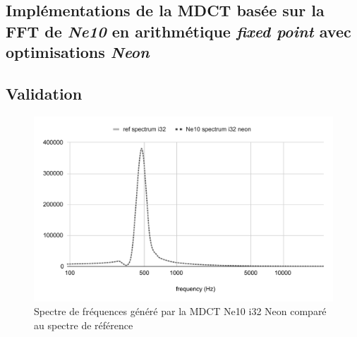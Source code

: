 \documentclass{article}
\begin{document}
%
%
%
%

    \subsection{Implémentations de la MDCT basée sur la FFT de \emph{Ne10} en arithmétique \emph{fixed point} avec optimisations \emph{Neon}}


    \subsection{Validation}
    \begin{figure}[H]
        \centering
        \includegraphics[width=.8\linewidth]{./images/validation_ne10_i32_neon.pdf}
        \caption{Spectre de fréquences généré par la MDCT Ne10 i32 Neon comparé au spectre de référence}
        \label{fig:validation_ne10_i32_neon}
    \end{figure}
\end{document}
